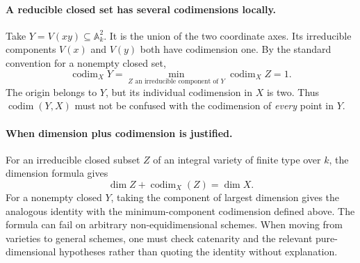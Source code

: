 \paragraph{A reducible closed set has several codimensions locally.}
Take \(Y=V(xy)\subseteq\mathbb A^2_k\).  It is the union
of the two coordinate axes.  Its irreducible components
\(V(x)\) and \(V(y)\) both have codimension one.  By the
standard convention for a nonempty closed set,
\[
 \operatorname{codim}_X Y=
 \min_{Z\text{ an irreducible component of }Y}
 \operatorname{codim}_X Z=1.
\]
The origin belongs to \(Y\), but its individual codimension in
\(X\) is two.  Thus \(\operatorname{codim}(Y,X)\) must not be
confused with the codimension of \emph{every} point in \(Y\).

\paragraph{When dimension plus codimension is justified.}
For an irreducible closed subset \(Z\) of an integral variety of
finite type over \(k\), the dimension formula gives
\[
 \dim Z+\operatorname{codim}_X(Z)=\dim X.
\]
For a nonempty closed \(Y\), taking the component of largest
dimension gives the analogous identity with the minimum-component
codimension defined above.  The formula can fail on arbitrary
non-equidimensional schemes.  When moving from varieties to
general schemes, one must check catenarity and the relevant
pure-dimensional hypotheses rather than quoting the identity
without explanation.
